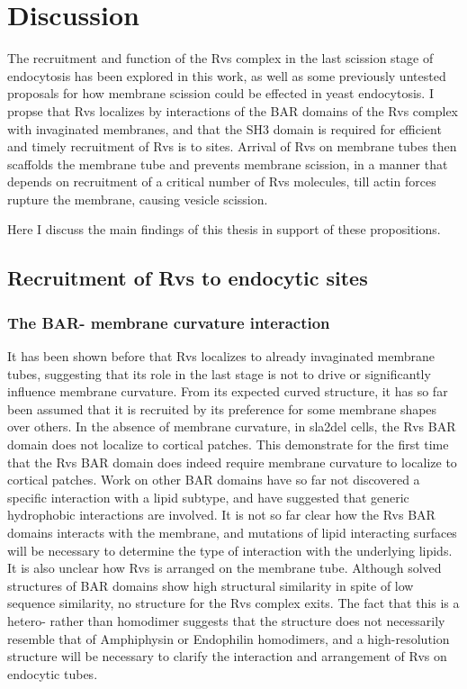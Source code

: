 
\chapter{Discussion}    
\label{Ch:discussion}
The recruitment and function of the Rvs complex in the last scission stage of endocytosis has been explored in this work, as well as some previously untested proposals for how membrane scission could be effected in yeast endocytosis. 
I propse that Rvs localizes by interactions of the BAR domains of the Rvs complex with invaginated membranes, and that the SH3 domain is required for efficient and timely recruitment of Rvs is to sites. Arrival of Rvs on membrane tubes then scaffolds the membrane tube and prevents membrane scission, in a manner that depends on recruitment of a critical number of Rvs molecules, till actin forces rupture the membrane, causing vesicle scission. 

Here I discuss the main findings of this thesis in support of these propositions.

\section{Recruitment of Rvs to endocytic sites}

\subsection{The BAR- membrane curvature interaction}

It has been shown before that Rvs localizes to already invaginated membrane tubes, suggesting that its role in the last stage is not to drive or significantly influence membrane curvature. From its expected curved structure, it has so far been assumed that it is recruited by its preference for some membrane shapes over others. In the absence of membrane curvature, in sla2del cells, the Rvs BAR domain does not localize to cortical patches. This demonstrate for the first time that the Rvs BAR domain does indeed require membrane curvature to localize to cortical patches. Work on other BAR domains have so far not discovered a specific interaction with a lipid subtype, and have suggested that generic hydrophobic interactions are involved. It is not so far clear how the Rvs BAR domains interacts with the membrane, and mutations of lipid interacting surfaces will be necessary to determine the type of interaction with the underlying lipids. It is also unclear how Rvs is arranged on the membrane tube. Although solved structures of BAR domains show high structural similarity in spite of low sequence similarity, no structure for the Rvs complex exits. The fact that this is a hetero- rather than homodimer suggests that the structure does not necessarily resemble that of Amphiphysin or Endophilin homodimers, and a high-resolution structure will be necessary to clarify the interaction and arrangement of Rvs on endocytic tubes. 



